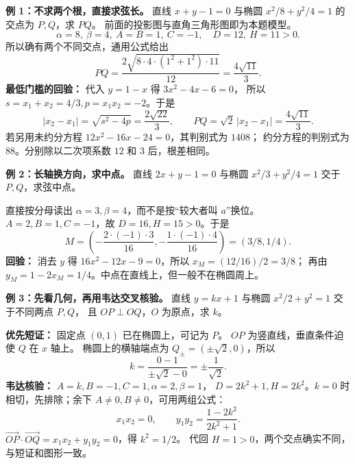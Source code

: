 \clearpage
\begin{examplebox}
\textbf{例 1：不求两个根，直接求弦长。}
直线 $x+y-1=0$ 与椭圆 $x^2/8+y^2/4=1$ 的交点为 $P,Q$，求 $PQ$。
前面的投影图与直角三角形图即为本题模型。
\[
 \alpha=8,\ \beta=4,\ A=B=1,\ C=-1,\quad D=12,\ H=11>0.
\]
所以确有两个不同交点，通用公式给出
\[
 PQ=\frac{2\sqrt{8\cdot4\cdot(1^2+1^2)\cdot11}}{12}
   =\boxed{\frac{4\sqrt{11}}3}.
\]
\textbf{最低门槛的回验：} 代入 $y=1-x$ 得 $3x^2-4x-6=0$，
所以 $s=x_1+x_2=4/3,p=x_1x_2=-2$。于是
\[
 |x_2-x_1|=\sqrt{s^2-4p}=\frac{2\sqrt{22}}3,\qquad
 PQ=\sqrt2\,|x_2-x_1|=\frac{4\sqrt{11}}3.
\]
若另用未约分方程 $12x^2-16x-24=0$，其判别式为 $1408$；
约分方程的判别式为 $88$。分别除以二次项系数 $12$ 和 $3$ 后，根差相同。

\tcbbreak
\textbf{例 2：长轴换方向，求中点。}
直线 $2x+y-1=0$ 与椭圆 $x^2/3+y^2/4=1$ 交于 $P,Q$，求弦中点。

直接按分母读出 $\alpha=3,\beta=4$，而不是按“较大者叫 $a$”换位。
$A=2,B=1,C=-1$，故 $D=16,H=15>0$。于是
\[
 M=\left(-\frac{2\cdot(-1)\cdot3}{16},-\frac{1\cdot(-1)\cdot4}{16}\right)
  =\boxed{(3/8,1/4)}.
\]
\textbf{回验：} 消去 $y$ 得 $16x^2-12x-9=0$，所以 $x_M=(12/16)/2=3/8$；
再由 $y_M=1-2x_M=1/4$。中点在直线上，但一般不在椭圆周上。

\tcbbreak
\textbf{例 3：先看几何，再用韦达交叉核验。}
直线 $y=kx+1$ 与椭圆 $x^2/2+y^2=1$ 交于不同两点 $P,Q$，
且 $OP\perp OQ$，$O$ 为原点，求 $k$。

\textbf{优先短证：} 固定点 $(0,1)$ 已在椭圆上，可记为 $P$。
$OP$ 为竖直线，垂直条件迫使 $Q$ 在 $x$ 轴上。
椭圆上的横轴端点为 $Q_\pm=(\pm\sqrt2,0)$，所以
\[
 k=\frac{0-1}{\pm\sqrt2-0}=\boxed{\pm\frac1{\sqrt2}}.
\]
\textbf{韦达核验：} $A=k,B=-1,C=1,\alpha=2,\beta=1$，
$D=2k^2+1,H=2k^2$。$k=0$ 时相切，先排除；余下 $A\ne0,B\ne0$，可用两组公式：
\[
 x_1x_2=0,\qquad y_1y_2=\frac{1-2k^2}{2k^2+1}.
\]
$\overrightarrow{OP}\cdot\overrightarrow{OQ}=x_1x_2+y_1y_2=0$，得 $k^2=1/2$。
代回 $H=1>0$，两个交点确实不同，与短证和图形一致。
\end{examplebox}
